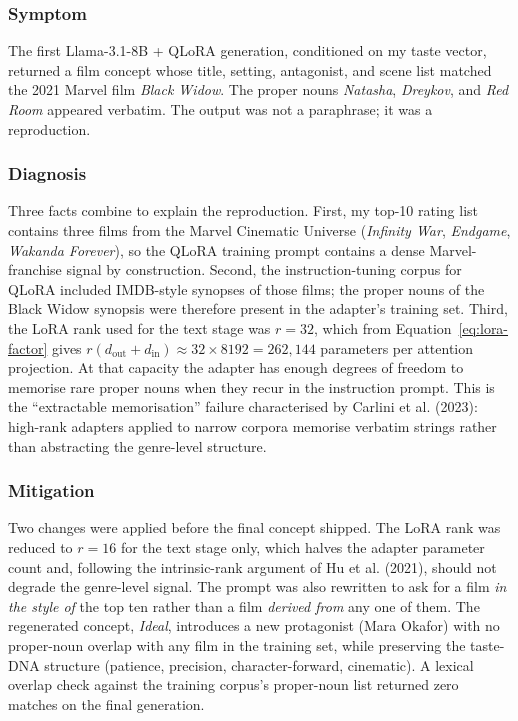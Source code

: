 \documentclass{article}
\begin{document}
\subsubsection*{Symptom}

The first Llama-3.1-8B + QLoRA generation, conditioned on my taste vector, returned a film concept whose title, setting, antagonist, and scene list matched the 2021 Marvel film \emph{Black Widow}. The proper nouns \emph{Natasha}, \emph{Dreykov}, and \emph{Red Room} appeared verbatim. The output was not a paraphrase; it was a reproduction.

\subsubsection*{Diagnosis}

Three facts combine to explain the reproduction. First, my top-10 rating list contains three films from the Marvel Cinematic Universe (\emph{Infinity War}, \emph{Endgame}, \emph{Wakanda Forever}), so the QLoRA training prompt contains a dense Marvel-franchise signal by construction. Second, the instruction-tuning corpus for QLoRA included IMDB-style synopses of those films; the proper nouns of the Black Widow synopsis were therefore present in the adapter's training set. Third, the LoRA rank used for the text stage was $r = 32$, which from Equation~\ref{eq:lora-factor} gives $r(d_\text{out} + d_\text{in}) \approx 32 \times 8192 = 262{,}144$ parameters per attention projection. At that capacity the adapter has enough degrees of freedom to memorise rare proper nouns when they recur in the instruction prompt. This is the ``extractable memorisation'' failure characterised by Carlini et al. (2023): high-rank adapters applied to narrow corpora memorise verbatim strings rather than abstracting the genre-level structure.

\subsubsection*{Mitigation}

Two changes were applied before the final concept shipped. The LoRA rank was reduced to $r = 16$ for the text stage only, which halves the adapter parameter count and, following the intrinsic-rank argument of Hu et al. (2021), should not degrade the genre-level signal. The prompt was also rewritten to ask for a film \emph{in the style of} the top ten rather than a film \emph{derived from} any one of them. The regenerated concept, \emph{Ideal}, introduces a new protagonist (Mara Okafor) with no proper-noun overlap with any film in the training set, while preserving the taste-DNA structure (patience, precision, character-forward, cinematic). A lexical overlap check against the training corpus's proper-noun list returned zero matches on the final generation.
\end{document}
